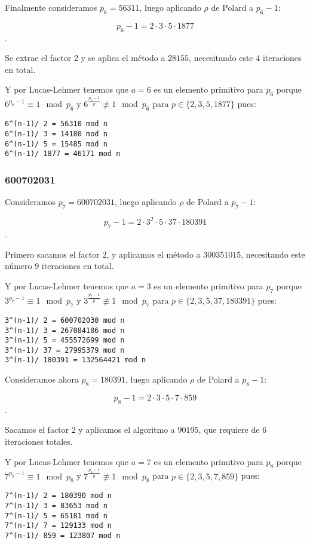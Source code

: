 \documentclass[a4paper]{article}
\begin{document}
Finalmente consideramos $p_6=56311$, luego aplicando $\rho$ de Polard a $p_6-1$:

$$p_6-1=2 \cdot 3\cdot 5\cdot 1877$$.

Se extrae el factor 2 y se aplica el método a $28155$, necesitando este 4 iteraciones en total.

Y por Lucas-Lehmer tenemos que $a=6$ es un elemento primitivo para $p_6$ porque $6^{p_6-1}\equiv 1\mod p_6$ y $6^{\frac{p_6-1}{p}}\not\equiv 1\mod p_6 $ para $p\in\{2, 3,5,1877\}$ pues:

\begin{verbatim}
6^(n-1)/ 2 = 56310 mod n
6^(n-1)/ 3 = 14180 mod n
6^(n-1)/ 5 = 15485 mod n
6^(n-1)/ 1877 = 46171 mod n
\end{verbatim}

\subsubsection{600702031}

Consideramos $p_7=600702031$, luego aplicando $\rho$ de Polard a $p_7-1$:

$$p_7-1=2 \cdot 3^2\cdot 5\cdot 37\cdot 180391$$.

Primero sacamos el factor 2, y aplicamos el método a $300351015$, necesitando este número 9 iteraciones en total.

Y por Lucas-Lehmer tenemos que $a=3$ es un elemento primitivo para $p_7$ porque $3^{p_7-1}\equiv 1\mod p_7$ y $3^{\frac{p_7-1}{p}}\not\equiv 1\mod p_7 $ para $p\in\{2, 3,5,37, 180391\}$ pues:

\begin{verbatim}
3^(n-1)/ 2 = 600702030 mod n
3^(n-1)/ 3 = 267084186 mod n
3^(n-1)/ 5 = 455572699 mod n
3^(n-1)/ 37 = 27995379 mod n
3^(n-1)/ 180391 = 132564421 mod n
\end{verbatim}

Consideramos ahora $p_8=180391$, luego aplicando $\rho$ de Polard a $p_8-1$:

$$p_8-1=2 \cdot 3\cdot 5\cdot 7\cdot 859$$.

Sacamos el factor 2 y aplicamos el algoritmo a $90195$, que requiere de 6 iteraciones totales.

Y por Lucas-Lehmer tenemos que $a=7$ es un elemento primitivo para $p_8$ porque $7^{p_8-1}\equiv 1\mod p_8$ y $7^{\frac{p_8-1}{p}}\not\equiv 1\mod p_8 $ para $p\in\{2, 3,5,7, 859\}$ pues:

\begin{verbatim}
7^(n-1)/ 2 = 180390 mod n
7^(n-1)/ 3 = 83653 mod n
7^(n-1)/ 5 = 65181 mod n
7^(n-1)/ 7 = 129133 mod n
7^(n-1)/ 859 = 123807 mod n
\end{verbatim}
\end{document}

